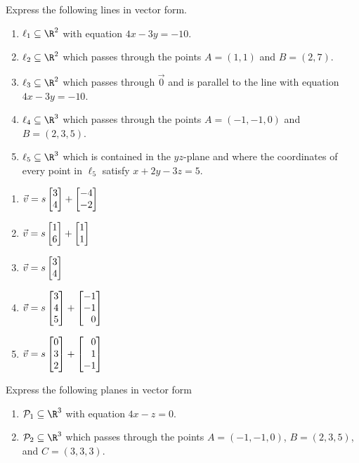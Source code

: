 \begin{exercises}
	\begin{problist}
		\prob  Express the following lines in vector form.
		\begin{enumerate}
			\item   $\ell_1\subseteq\R^2$ with equation $4x-3y=-10$. 
			\item   $\ell_2\subseteq\R^2$ which passes through the points $A=(1,1)$ and $B=(2,7)$.
			\item   $\ell_3\subseteq\R^2$ which passes through $\vec 0$ and is parallel to the line
				with equation $4x-3y=-10$.
			\item   $\ell_4\subseteq\R^3$ which passes through the points $A=(-1,-1,0)$ and $B=(2,3,5)$.
			\item   $\ell_5\subseteq\R^3$ which is contained in the $yz$-plane and where the coordinates
				of every point in $\ell_5$ satisfy $x+2y-3z=5$.
		\end{enumerate}
		\begin{solution}
    		\begin{enumerate}
    		    \item $\vec v = s\mat{3\\4} + \mat{-4\\-2} $
    		    \item $\vec v = s\mat{1\\6} + \mat{1\\1} $
    		    \item $\vec v = s\mat{3\\4}$
    		    \item $\vec v = s\mat{3\\4\\5} + \mat{-1\\-1 \\0}$
    		    \item $\vec v = s\mat{0\\3\\2} + \mat{0\\1\\-1}$
    		\end{enumerate}
		\end{solution}
		\prob Express the following planes in vector form
		\begin{enumerate}
			\item   $\mathcal P_1\subseteq\R^3$ with equation $4x-z=0$.
			\item   $\mathcal P_2\subseteq\R^3$ which passes through the points $A=(-1,-1,0)$, $B=(2,3,5)$, and $C=(3,3,3)$.

\end{enumerate}
\end{problist}
\end{exercises}

